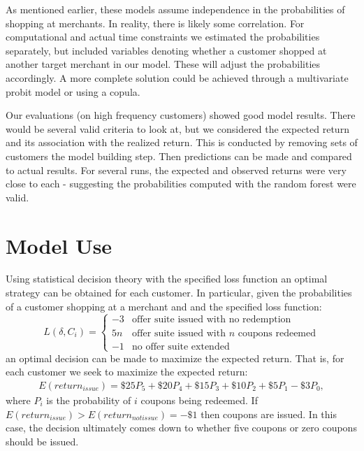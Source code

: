 \documentclass[12pt]{article} %
\begin{document}
As mentioned earlier, these models assume independence in the probabilities of shopping at merchants.  In reality, there is likely some correlation.  For computational and actual time constraints we estimated the probabilities separately, but included variables denoting whether a customer shopped at another target merchant in our model.  These will adjust the probabilities accordingly.  A more complete solution could be achieved through a multivariate probit model or using a copula.

Our evaluations (on high frequency customers) showed good model results.  There would be several valid criteria to look at, but we considered the expected return and its association with the realized return.  This is conducted by removing sets of customers the model building step.  Then predictions can be made and compared to actual results.  For several runs, the expected and observed returns were very close to each - suggesting the probabilities computed with the random forest were valid.   
\section{Model Use}
Using statistical decision theory with the specified loss function an optimal strategy can be obtained for each customer.
In particular, given the probabilities of a customer shopping at a merchant and and the specified loss function:  
\[
L(\delta,C_i) = \left\{
\begin{array}{rl}
-3 & \mbox{offer suite issued with no redemption} \\
5n & \mbox{offer suite issued with }  n  \mbox{ coupons redeemed} \\
-1 & \mbox{no offer suite extended}
\end{array}
\right.
\] 
an optimal decision can be made to maximize the expected return.  That is, for each customer we seek to maximize the expected return:
\begin{eqnarray}
E(return_{issue}) = \$25 P_5 + \$20 P_4 + \$15 P_3 +\$10 P_2 +\$5 P_1 - \$3 P_0,
\end{eqnarray}
where $P_i$ is the probability of $i$ coupons being redeemed.  If $E(return_{issue}) > E(return_{notissue}) =-\$1$ then coupons are issued.  In this case, the decision ultimately comes down to whether five coupons or zero coupons should be issued.
\end{document}
